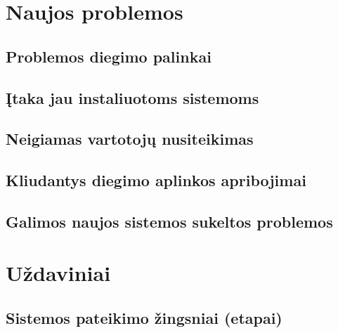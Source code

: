 \documentclass[12pt]{article}
\begin{document}


\newpage

\section{Naujos problemos}
\subsection{Problemos diegimo palinkai}

\subsection{Įtaka jau instaliuotoms sistemoms}

\subsection{Neigiamas vartotojų nusiteikimas}

\subsection{Kliudantys diegimo aplinkos apribojimai}

\subsection{Galimos naujos sistemos sukeltos problemos}

\newpage

\section{Uždaviniai}
\subsection{Sistemos pateikimo žingsniai (etapai)}

\end{document}
